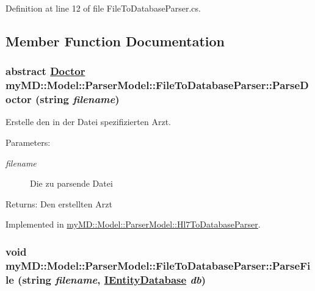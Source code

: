 Definition at line 12 of file File\-To\-Database\-Parser.cs.

\subsection{Member Function Documentation}
\hypertarget{classmy_m_d_1_1_model_1_1_parser_model_1_1_file_to_database_parser_8f5b7fa31916486a50b050795daa395c}{
\subsubsection[ParseDoctor]{\setlength{\rightskip}{0pt plus 5cm}abstract \hyperlink{classmy_m_d_1_1_model_1_1_data_model_1_1_doctor}{Doctor} my\-MD::Model::Parser\-Model::File\-To\-Database\-Parser::Parse\-Doctor (string {\em filename})}}
\label{df/d8f/classmy_m_d_1_1_model_1_1_parser_model_1_1_file_to_database_parser_8f5b7fa31916486a50b050795daa395c}


Erstelle den in der Datei spezifizierten Arzt. 

\begin{Desc}
\item[Parameters:]
\begin{description}
\item[{\em filename}]Die zu parsende Datei\end{description}
\end{Desc}
\begin{Desc}
\item[Returns:]Den erstellten Arzt\end{Desc}


Implemented in \hyperlink{classmy_m_d_1_1_model_1_1_parser_model_1_1_hl7_to_database_parser_8f5b7fa31916486a50b050795daa395c}{my\-MD::Model::Parser\-Model::Hl7To\-Database\-Parser}.\hypertarget{classmy_m_d_1_1_model_1_1_parser_model_1_1_file_to_database_parser_8ef40647d404611dade84e3f8f4e341c}{
\subsubsection[ParseFile]{\setlength{\rightskip}{0pt plus 5cm}void my\-MD::Model::Parser\-Model::File\-To\-Database\-Parser::Parse\-File (string {\em filename}, \hyperlink{interfacemy_m_d_1_1_model_1_1_database_model_1_1_i_entity_database}{IEntity\-Database} {\em db})}}
\label{df/d8f/classmy_m_d_1_1_model_1_1_parser_model_1_1_file_to_database_parser_8ef40647d404611dade84e3f8f4e341c}


